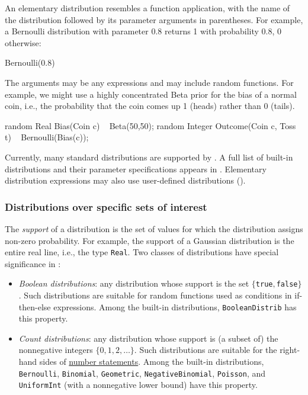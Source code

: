 \documentclass[12pt]{article}
\begin{document}
An elementary distribution resembles a function application, with the name of the distribution
followed by its parameter arguments in parentheses. For example, a Bernoulli distribution with parameter 0.8
returns 1 with probability 0.8, 0 otherwise:
\begin{blogcode}
Bernoulli(0.8)
\end{blogcode}
The arguments may be any expressions and may include random functions. For example,
we might use a highly concentrated Beta prior for the bias of a normal coin, i.e., the probability that the coin comes up 1 (heads) rather than 0 (tails).
\begin{blogcode}
random Real Bias(Coin c) ~ Beta(50,50);
random Integer Outcome(Coin c, Toss t) ~ Bernoulli(Bias(c));
\end{blogcode}
Currently, many standard distributions are supported by \bl. A full
list of built-in distributions and their parameter specifications
appears in .  Elementary
distribution expressions may also use user-defined distributions
().


\subsubsection{Distributions over specific sets of interest}\label{special-distribution-section}
The {\em support} of a distribution is the set of values for which
the distribution assigns non-zero probability. For example, the
support of a Gaussian distribution is the entire real line, i.e., the
type {\tt Real}. Two classes of distributions have special
significance
in \bl:
\begin{itemize}
\item {\em Boolean distributions}: any distribution whose support is
  the set $\{${\tt true}$,${\tt false}$\}$. Such distributions are
  suitable for random functions used as conditions in if-then-else
  expressions. Among the built-in distributions, {\tt BooleanDistrib}
  has this property.
\item {\em Count distributions}: any distribution whose support is
  (a subset of) the nonnegative integers $\{0,1,2,\ldots\}$. Such distributions are
  suitable for the right-hand sides of
  \hyperref[number-section]{number statements}. Among the built-in
  distributions, {\tt Bernoulli}, {\tt Binomial},
  {\tt Geometric}, {\tt NegativeBinomial}, {\tt Poisson}, and {\tt
    UniformInt} (with a nonnegative lower bound) have this property.
\end{itemize}
\end{document}
